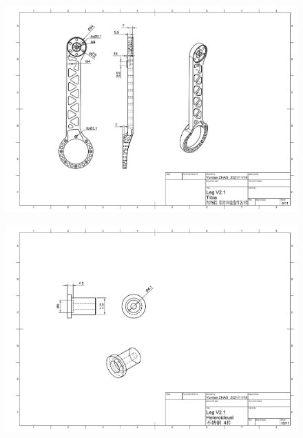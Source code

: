 \begin{figure}
  \centering
  \includegraphics[width=1.4\linewidth, angle=90]{figures/appendix/dwg9.pdf}
   \vspace{6pt}
\end{figure}

\begin{figure}
  \centering
  \includegraphics[width=1.4\linewidth, angle=90]{figures/appendix/dwg10.pdf}
   \vspace{6pt}
\end{figure}

